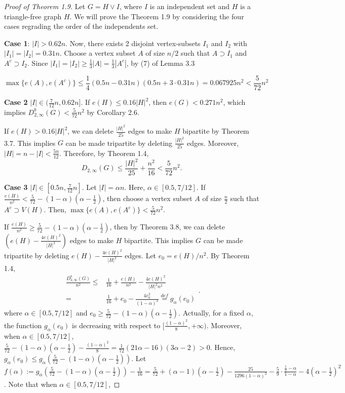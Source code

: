 \documentclass[11pt, oneside]{article}   	%
\begin{document}
\begin{proof}[Proof of Theorem 1.9]

Let  $G= H\vee I$, where $I$ is an independent set and $H$ is a triangle-free graph $H$. We will prove the Theorem 1.9 by considering the four cases regrading the order of the independents set.  

\textbf{Case 1}: $|I|>0.62n$. Now, there exists 2 disjoint vertex-subsets $I_1$ and $I_2$ with $|I_1|=|I_2|=0.31n$. Choose a vertex subset $A$ of size $n/2$ such that $A\supset I_1$ and $A^c\supset I_2$. Since $|I_1|=|I_2|\geq\frac{1}{3}|A|=\frac{1}{3}|A^c|$, by (7) of Lemma 3.3

$$
\max\{e(A),e(A^c)\}\leq \frac{1}{4}(0.5n-0.31n)(0.5n+3\cdot 0.31n)=0.067925n^2<\frac 5 {72} n^2
$$


\textbf{Case 2} $|I|\in(\frac{7}{12}n,0.62n]$. 
If $e(H)\leq 0.16|H|^2$, then $e(G)<0.271n^2$, which implies $D_{2,\infty}^b(G)<\frac{5}{72}n^2$ by Corollary 2.6.

If $e(H)> 0.16|H|^2$, we can delete $\frac{|H|^2}{25}$ edges to make $H$ bipartite by Theorem 3.7. This implies $G$ can be made tripartite by deleting $\frac{|H|^2}{25}$ edges. Moreover, $|H|=n-|I|<\frac {5n}{12}$. Therefore, by Theorem 1.4, 
$$D_{2,\infty}(G)\leq \frac{|H|^2}{25}+\frac{n^2}{16}< \frac 5 {72} n^2.$$

\textbf{Case 3} $|I|\in [0.5n,\frac{7}{12}n]$. Let $|I|=\alpha n$. Here, $\alpha \in[0.5,7/12]$.  If $\frac{e(H)}{n^2}< \frac{5}{72}-(1-\alpha) (\alpha-\frac 1 2)$, then choose a vertex subset $A$ of size $\frac{n}{2}$ such that $A^c\supset V(H)$. Then, $\max\{e(A),e(A^c)\}<\frac{5}{72}n^2$. 

If $\frac{e(H)}{n^2}\geq \frac{5}{72}-(1-\alpha) (\alpha-\frac 1 2)$, then by Theorem 3.8, we can delete $\left(e(H)-\frac{4 e(H)^2}{|H|^2}\right)$ edges to make $H$ bipartite. This implies $G$ can be made tripartite by deleting $e(H)-\frac{4 e(H)^2}{|H|^2}$ edges. Let $e_0=e(H)/n^2$. By Theorem 1.4, 
$$
\begin{aligned}
\frac{D_{2,\infty}^b(G)}{n^2} \leq& \frac{1}{16}+\frac{e(H)}{n^2}-\frac{4 e(H)^2}{|H|^2n^2}\\
=& \frac{1}{16}+e_0-\frac{4e_0^2}{(1-\alpha)^2}\overset{def}{=}g_\alpha(e_0)
\end{aligned}.
$$
where $\alpha \in[0.5,7/12]$ and $e_0\geq \frac{5}{72}-(1-\alpha) (\alpha-\frac 1 2)$. Actually, for a fixed $\alpha$, the function $g_\alpha(e_0)$ is decreasing with respect to $[\frac{(1-\alpha)^2}{8},+\infty)$. Moreover, when $\alpha \in[0.5,7/12]$, $\frac{5}{72}-(1-\alpha) (\alpha-\frac 1 2)-\frac{(1-\alpha)^2}{8}=\frac{1}{72}(21\alpha -16)(3\alpha -2)>0$. Hence, $g_\alpha(e_0)\leq g_\alpha(\frac{5}{72}-(1-\alpha) (\alpha-\frac 1 2))$. Let $f(\alpha):=g_\alpha(\frac{5}{72}-(1-\alpha) (\alpha-\frac 1 2))-\frac{1}{16}=\frac{5}{72}+(\alpha-1)(\alpha-\frac 1 2)-\frac{25}{1296(1-\alpha)^2}-\frac{5}{9}\cdot\frac{\frac{1}{2}-\alpha}{1-\alpha}-4(\alpha-\frac 1 2)^2$.
Note that when $\alpha \in[0.5,7/12]$, 


\end{proof}
\end{document}
